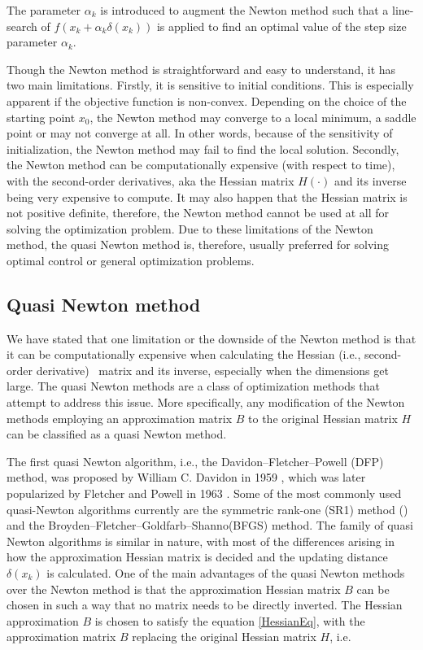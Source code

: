\documentclass  [
  paper    = a4,
  BCOR     = 10mm,
  twoside,
  fontsize = 12pt,
  fleqn,
  toc      = bibnumbered,
  toc      = listofnumbered,
  numbers  = noendperiod,
  headings = normal,
  listof   = leveldown,
  version  = 3.03
]                                       {scrreprt}
\newcommand{\<}{\langle}
\renewcommand{\>}{\rangle}
\begin{document}
The parameter $\alpha_k$ is introduced to augment the Newton method such that a line-search of $f(x_k + \alpha_k \delta(x_k))$ is applied to find an optimal value of the step size parameter $\alpha_k$. 

Though the Newton method is straightforward and easy to understand, it has two main limitations. Firstly, it is sensitive to initial conditions. This is especially apparent if the objective function is non-convex. Depending on the choice of the starting point $x_0$, the Newton method may converge to a local minimum, a saddle point or may not converge at all. In other words, because of the sensitivity of initialization, the Newton method may fail to find the local solution. Secondly, the Newton method can be computationally expensive (with respect to time), with the second-order derivatives, aka the Hessian matrix $H(\cdot)$ and its inverse being very expensive to compute. It may also happen that the Hessian matrix is not positive definite, therefore, the Newton method cannot be used at all for solving the optimization problem. Due to these limitations of the Newton method, the quasi Newton method is, therefore, usually preferred for solving optimal control or general optimization problems.


\subsection{Quasi Newton method}
We have stated that one limitation or the downside of the Newton method is that it can be computationally expensive when calculating the Hessian (i.e., second-order derivative)  matrix and its inverse, especially when the dimensions get large. The quasi Newton methods are a class of optimization methods that attempt to address this issue. More specifically, any modification of the Newton methods employing an approximation matrix $B$ to the original Hessian matrix $H$ can be classified as a quasi Newton method. 

The first quasi Newton algorithm, i.e., the Davidon–Fletcher–Powell (DFP) method, was proposed by William C. Davidon in 1959 \cite{WilDav59}, which was later popularized by Fletcher and Powell in 1963 \cite{FlePow63}. Some of the most commonly used quasi-Newton algorithms currently are the symmetric rank-one (SR1) method (\cite{ANP91}) and the Broyden–Fletcher–Goldfarb–Shanno(BFGS) method. The family of quasi Newton algorithms is similar in nature, with most of the differences arising in how the approximation Hessian matrix is decided and the updating distance $\delta(x_k) $ is calculated. One of the main advantages of the quasi Newton methods over the Newton method is that the approximation Hessian matrix $B$ can be chosen in such a way that no matrix needs to be directly inverted. The Hessian approximation $B$ is chosen to satisfy the equation \ref{HessianEq}, with the approximation matrix $B$ replacing the original Hessian matrix $H$, i.e.
\end{document}
